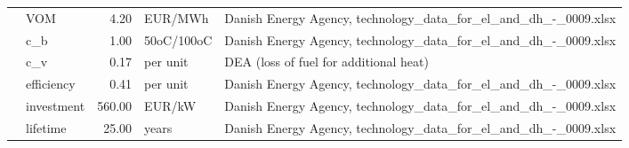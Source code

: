 \begin{longtable}{p{5cm}p{3cm}rp{3cm}p{11cm}}
                      & VOM &           4.20 &                           EUR/MWh &                                                                                                                                                                                                                                                                      Danish Energy Agency, technology\_data\_for\_el\_and\_dh\_-\_0009.xlsx \\
                      & c\_b &           1.00 &                        50oC/100oC &                                                                                                                                                                                                                                                                      Danish Energy Agency, technology\_data\_for\_el\_and\_dh\_-\_0009.xlsx \\
                      & c\_v &           0.17 &                          per unit &                                                                                                                                                                                                                                                                                               DEA (loss of fuel for additional heat) \\
                      & efficiency &           0.41 &                          per unit &                                                                                                                                                                                                                                                                      Danish Energy Agency, technology\_data\_for\_el\_and\_dh\_-\_0009.xlsx \\
                      & investment &         560.00 &                            EUR/kW &                                                                                                                                                                                                                                                                      Danish Energy Agency, technology\_data\_for\_el\_and\_dh\_-\_0009.xlsx \\
                      & lifetime &          25.00 &                             years &                                                                                                                                                                                                                                                                      Danish Energy Agency, technology\_data\_for\_el\_and\_dh\_-\_0009.xlsx \\

\end{longtable}
